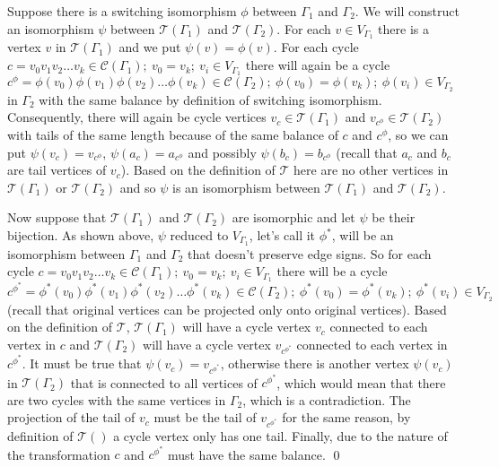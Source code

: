 Suppose there is a switching isomorphism $\phi$ between $\Gamma _1$ and $\Gamma _2$. We will construct an isomorphism $\psi$ between $\mathcal{T} (\Gamma _1)$ and $\mathcal{T} (\Gamma _2)$. For each $v \in V_{\Gamma _1}$ there is a vertex $v$ in $\mathcal{T} (\Gamma _1)$ and we put $\psi (v) = \phi (v)$. For each cycle $c = v_0v_1v_2 \dots v_k \in \mathcal{C} (\Gamma _1); ~ v_0 = v_k; ~ v_i \in V_{\Gamma _1}$ there will again be a cycle $c ^{\phi} = \phi(v_0)\phi(v_1)\phi(v_2) \dots \phi(v_k) \in \mathcal{C} (\Gamma _2); ~ \phi(v_0) = \phi(v_k); ~ \phi(v_i) \in V_{\Gamma _2}$ in $\Gamma _2$ with the same balance by definition of switching isomorphism. Consequently, there will again be cycle vertices $v_c \in \mathcal{T} (\Gamma _1)$ and $v_{c ^{\phi}} \in \mathcal{T} (\Gamma _2)$ with tails of the same length because of the same balance of $c$ and $c ^{\phi}$, so we can put $\psi (v_c) = v_{c ^{\phi}}$, $\psi (a_c) = a_{c ^{\phi}}$ and possibly $\psi (b_c) = b_{c ^{\phi}}$ (recall that $a_c$ and $b_c$ are tail vertices of $v_c$). Based on the definition of $\mathcal{T}$ here are no other vertices in $\mathcal{T} (\Gamma _1)$ or $\mathcal{T} (\Gamma _2)$ and so $\psi$ is an isomorphism between $\mathcal{T} (\Gamma _1)$ and $\mathcal{T} (\Gamma _2)$.

Now suppose that $\mathcal{T} (\Gamma _1)$ and $\mathcal{T} (\Gamma _2)$ are isomorphic and let $\psi$ be their bijection. As shown above, $\psi$ reduced to $V_{\Gamma _1}$, let's call it $\phi ^*$, will be an isomorphism between $\Gamma _1$ and $\Gamma _2$ that doesn't preserve edge signs. So for each cycle $c = v_0v_1v_2 \dots v_k \in \mathcal{C} (\Gamma _1); ~ v_0 = v_k; ~ v_i \in V_{\Gamma _1}$ there will be a cycle $c ^{\phi ^*} = \phi ^*(v_0)\phi ^*(v_1)\phi ^*(v_2) \dots \phi ^*(v_k) \in \mathcal{C} (\Gamma _2); ~ \phi ^*(v_0) = \phi ^*(v_k); ~ \phi ^*(v_i) \in V_{\Gamma _2}$ (recall that original vertices can be projected only onto original vertices). Based on the definition of $\mathcal{T}$, $\mathcal{T} (\Gamma _1)$ will have a cycle vertex $v_c$ connected to each vertex in $c$ and $\mathcal{T} (\Gamma _2)$ will have a cycle vertex $v_{c^{\phi ^*}}$ connected to each vertex in $c^{\phi ^*}$. It must be true that $\psi (v_c) = v_{c^{\phi ^*}}$, otherwise there is another vertex $\psi (v_c)$ in $\mathcal{T} (\Gamma _2)$ that is connected to all vertices of $c ^{\phi ^*}$, which would mean that there are two cycles with the same vertices in $\Gamma _2$, which is a contradiction. The projection of the tail of $v_c$ must be the tail of $v_{c^{\phi ^*}}$ for the same reason, by definition of $\mathcal{T} ()$ a cycle vertex only has one tail. Finally, due to the nature of the transformation $c$ and $c ^{\phi ^*}$ must have the same balance. \qed

